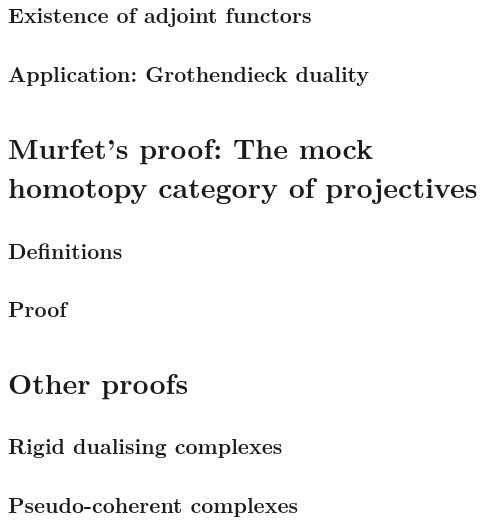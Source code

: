 \documentclass[10pt,a4paper]{article}
\begin{document}
\subsection{Existence of adjoint functors}

\subsection{Application: Grothendieck duality}

\section{Murfet's proof: The mock homotopy category of projectives}
\label{section:murfet}
\subsection{Definitions}
\label{subsection:definitions}

\subsection{Proof}
\label{subsection:proof}

\section{Other proofs}
\label{section:other}
\subsection{Rigid dualising complexes}
\label{subsection:yekutieli-zhang}

\subsection{Pseudo-coherent complexes}
\label{subsection:lipman}



\printbibliography
\end{document}
